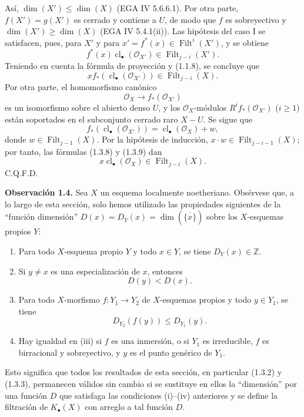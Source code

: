 \documentclass[11pt]{article}
\providecommand{\Filt}{\operatorname{Filt}}
\providecommand{\cl}{\operatorname{cl}}
\begin{document}
Así, $\dim(X')\leq\dim(X)$ (EGA IV 5.6.6.1). Por otra parte,
$f(X')=g(X')$ es cerrado y contiene a $U$, de modo que $f$ es sobreyectivo y
$\dim(X')\geq\dim(X)$ (EGA IV 5.4.1(ii)). Las hipótesis del caso I se
satisfacen, pues, para $X'$ y para
$x'=f^*(x)\in\Filt^i(X')$, y se obtiene
\begin{equation}\tag{1.3.7'}
f^*(x)\cl_\bullet(\mathcal O_{X'})\in\Filt_{j-i}(X').
\end{equation}
Teniendo en cuenta la fórmula de proyección y (1.1.8), se concluye que
\begin{equation}\tag{1.3.8}
x f_*(\cl_\bullet(\mathcal O_{X'}))\in\Filt_{j-i}(X).
\end{equation}
Por otra parte, el homomorfismo canónico
\[
\mathcal O_X\longrightarrow f_*(\mathcal O_{X'})
\]
es un isomorfismo sobre el abierto denso $U$, y los $\mathcal O_X$-módulos
$R^if_*(\mathcal O_{X'})$ ($i\geq1$) están soportados en el subconjunto
cerrado raro $X-U$. Se sigue que
\begin{equation}\tag{1.3.9}
f_*(\cl_\bullet(\mathcal O_{X'}))
=\cl_\bullet(\mathcal O_X)+w,
\end{equation}
donde $w\in\Filt_{j-1}(X)$. Por la hipótesis de inducción,
$x\cdot w\in\Filt_{j-i-1}(X)$; por tanto, las fórmulas (1.3.8) y (1.3.9)
dan
\[
x\cl_\bullet(\mathcal O_X)\in\Filt_{j-i}(X).
\]
C.Q.F.D.

\textbf{Observación 1.4.}
Sea $X$ un esquema localmente noetheriano. Obsérvese que, a lo largo de esta
sección, solo hemos utilizado las propiedades siguientes de la ``función
dimensión''
$D(x)=D_Y(x)=\dim(\overline{\{x\}})$ sobre los $X$-esquemas propios $Y$:
\begin{enumerate}
\item[(i)] Para todo $X$-esquema propio $Y$ y todo $x\in Y$, se tiene
$D_Y(x)\in\mathbb Z$.
\item[(ii)] Si $y\ne x$ es una especialización de $x$, entonces
\[
D(y)<D(x).
\]
\item[(iii)] Para todo $X$-morfismo $f:Y_1\to Y_2$ de $X$-esquemas propios
y todo $y\in Y_1$, se tiene
\[
D_{Y_2}(f(y))\leq D_{Y_1}(y).
\]
\item[(iv)] Hay igualdad en (iii) si $f$ es una inmersión, o si $Y_1$ es
irreducible, $f$ es birracional y sobreyectivo, y $y$ es el punto genérico de
$Y_1$.
\end{enumerate}
Esto significa que todos los resultados de esta sección, en particular
(1.3.2) y (1.3.3), permanecen válidos sin cambio si se sustituye en ellos la
``dimensión'' por una función $D$ que satisfaga las condiciones (i)--(iv)
anteriores y se define la filtración de $K_\bullet(X)$ con arreglo a tal
función $D$.
\end{document}
